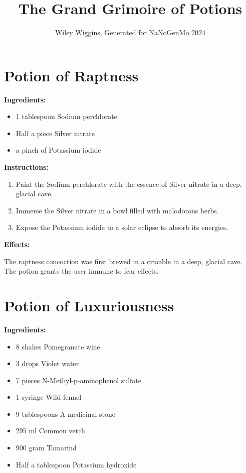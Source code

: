 \documentclass{article}
\title{The Grand Grimoire of Potions}
\author{Wiley Wiggins, Generated for NaNoGenMo 2024}
\date{}
\begin{document}
\maketitle

\newpage
\section*{Potion of Raptness}

\textbf{Ingredients:}

\begin{itemize}
  \item 1 tablespoon Sodium perchlorate
  \item Half a piece Silver nitrate
  \item a pinch of Potassium iodide
\end{itemize}

\textbf{Instructions:}

\begin{enumerate}
  \item Paint the Sodium perchlorate with the essence of Silver nitrate in a deep, glacial cave.
  \item Immerse the Silver nitrate in a bowl filled with malodorous herbs.
  \item Expose the Potassium iodide to a solar eclipse to absorb its energies.
\end{enumerate}

\textbf{Effects:}

The raptness concoction was first brewed in a crucible in a deep, glacial cave. The potion grants the user immune to fear effects.

\newpage
\section*{Potion of Luxuriousness}

\textbf{Ingredients:}

\begin{itemize}
  \item 8 shakes Pomegranate wine
  \item 3 drops Violet water
  \item 7 pieces N-Methyl-p-aminophenol sulfate
  \item 1 syringe Wild fennel
  \item 9 tablespoons A medicinal stone
  \item 295 ml Common vetch
  \item 900 gram Tamarind
  \item Half a tablespoon Potassium hydroxide
\end{itemize}
\end{document}
